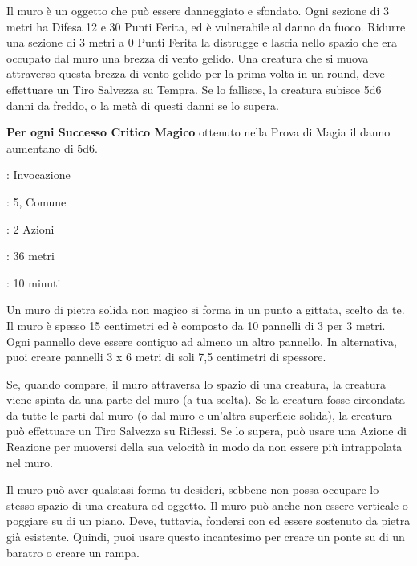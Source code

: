 \begin{multicols}{2}
Il muro è un oggetto che può essere danneggiato e sfondato. Ogni sezione di 3 metri ha Difesa 12 e 30 Punti Ferita, ed è vulnerabile al danno da fuoco. Ridurre una sezione di 3 metri a 0 Punti Ferita la distrugge e lascia nello spazio che era occupato dal muro una brezza di vento gelido. Una creatura che si muova attraverso questa brezza di vento gelido per la prima volta in un round, deve effettuare un Tiro Salvezza su Tempra. Se lo fallisce, la creatura subisce 5d6 danni da freddo, o la metà di questi danni se lo supera.

\textbf{Per ogni Successo Critico Magico} ottenuto nella Prova di Magia il danno aumentano di 5d6.

\noindent\colorbox{OBSSgold!10}{
\begin{minipage}{0.95\linewidth}
\begin{description}[noitemsep, topsep=0pt, parsep=0pt, partopsep=0pt, leftmargin=0cm, labelwidth=1.3cm]
	\item[\textbf{Lista}]: Invocazione
	\item[\textbf{Livello}]: 5, Comune
	\item[\textbf{Lancio}]: 2 Azioni
	\item[\textbf{Gittata}]: 36 metri
	\item[\textbf{Durata}]: 10 minuti
\end{description}
\end{minipage}}\smallskip

Un muro di pietra solida non magico si forma in un punto a gittata, scelto da te. Il muro è spesso 15 centimetri ed è composto da 10 pannelli di 3 per 3 metri. Ogni pannello deve essere contiguo ad almeno un altro pannello. In alternativa, puoi creare pannelli 3 x 6 metri di soli 7,5 centimetri di spessore.

Se, quando compare, il muro attraversa lo spazio di una creatura, la creatura viene spinta da una parte del muro (a tua scelta). Se la creatura fosse circondata da tutte le parti dal muro (o dal muro e un'altra superficie solida), la creatura può effettuare un Tiro Salvezza su Riflessi. Se lo supera, può usare una Azione di Reazione per muoversi della sua velocità in modo da non essere più intrappolata nel muro.

Il muro può aver qualsiasi forma tu desideri, sebbene non possa occupare lo stesso spazio di una creatura od oggetto. Il muro può anche non essere verticale o poggiare su di un piano. Deve, tuttavia, fondersi con ed essere sostenuto da pietra già esistente. Quindi, puoi usare questo incantesimo per creare un ponte su di un baratro o creare un rampa.


\end{multicols}
